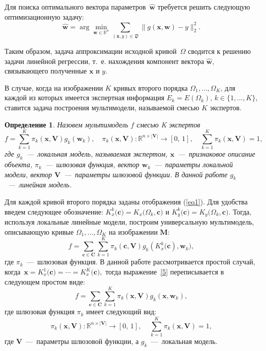 \documentclass[12pt, twoside]{article}
\newtheorem{definition}{Определение}[section]
\numberwithin{equation}{section}
\begin{document}
Для поиска оптимального вектора параметров~$\hat{\mathbf{w}}$ требуется решить следующую оптимизационную задачу:
\begin{equation}
	\hat{\mathbf{w}} = \arg\min_{\mathbf{w}\in\mathbb{R}^n} \sum_{\left(\mathbf{x}, y\right) \in \mathfrak{D}}\|g(\mathbf{x}, \mathbf{w}) - y \|_2^2.
\end{equation} 

Таким образом, задача аппроксимации исходной кривой~$\Omega$ сводится к решению задачи линейной регрессии, т.~е. нахождения компонент вектора $\hat{\mathbf{w}}$, связывающего полученные $\mathbf{x}$ и $y$.

В случае, когда на изображении $K$ кривых второго порядка  $\Omega_1, \dots, \Omega_K$, для каждой из которых имеется экспертная информация $E_k = E(\Omega_k), \, k \in \{1, \dots, K\}$, ставится задача построения мультимодели, называемой смесью $K$ экспертов. 

\begin{definition}
Назовем мультимодель $f$ смесью K экспертов
\begin{equation}
	f = \sum\limits_{k = 1}^{K}\pi_k(\mathbf{x}, \mathbf{V})g_k(\mathbf{w}_k),  \quad \pi_k(\mathbf{x}, \mathbf{V}): \mathbb{R}^{n\times |\mathbf{V}|} \rightarrow [0, \, 1], \quad \sum\limits_{k = 1}^{K}\pi_k(\mathbf{x}, \mathbf{V}) = 1, 
\end{equation}
где $g_k$~---~локальная модель, называемая экспертом, $\mathbf{x}$~---~признаковое описание объекта, $\pi_k$~---~шлюзовая функция, вектор $\mathbf{w}_k$~---~параметры локальной модели, вектор $\mathbf{V}$~---~параметры шлюзовой функции. В данной работе $g_k$~---~линейная модель.
\end{definition}

Для каждой кривой второго порядка заданы отображения (\ref{eq1}). Для удобства введем следующее обозначение: $K_x^k\bigr(\mathbf{c}\bigr) = K_x\bigr(\Omega_k, \mathbf{c}\bigr)$ и $K_y^k\bigr(\mathbf{c}\bigr) = K_y\bigr(\Omega_k, \mathbf{c}\bigr)$. Тогда, используя локальные линейные модели, построим универсальную мультимодель, описывающую кривые $\Omega_1, \dots, \Omega_K$ на изображении $\mathbf{M}$:
\begin{equation}
\label{5}
	f = \sum\limits_{\mathbf{c} \in \mathbf{C}} \sum_{k = 1}^{K} \pi_k(\mathbf{c}, \mathbf{V})g_k(K^k_{x}\bigl(\mathbf{c}), \mathbf{w}_k), 
\end{equation}
где $\pi_k$~---~шлюзовая функция. В данной работе рассмотривается простой случай, когда~$\mathbf{x}=K^1_{x}\bigl(\mathbf{c})=\cdots=K^K_{x}\bigl(\mathbf{c}),$ тогда выражение~\eqref{5} переписывается в следующем простом виде:
\begin{equation}
\label{5_1}
	f = \sum\limits_{\mathbf{c} \in \mathbf{C}} \sum_{k = 1}^{K} \pi_k(\mathbf{x}, \mathbf{V})g_k(\mathbf{x}, \mathbf{w}_k), 
\end{equation}
где шлюзовая функция $\pi_k$ имеет следующий вид:
\begin{equation}
\label{6}
	\pi_k(\mathbf{x}, \mathbf{V}): \mathbb{R}^{n\times |\mathbf{V}|} \rightarrow [0, \, 1], \; \; \; \; \sum\limits_{k = 1}^{K}\pi_k(\mathbf{x}, \mathbf{V}) = 1,
\end{equation}
где $\mathbf{V}$~---~параметры шлюзовой функции, а $g_k$~---~локальная модель.
    
\end{document}
